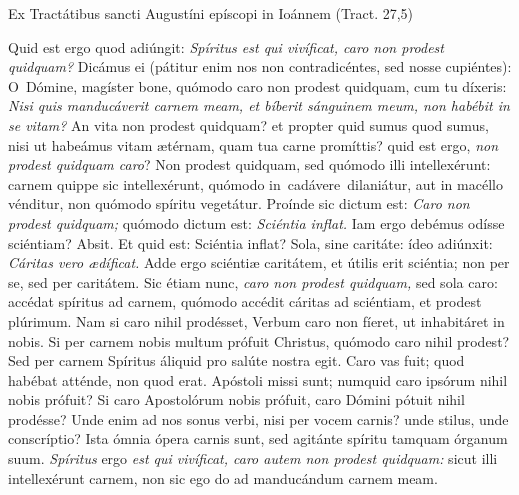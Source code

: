 \documentclass[options]{article}
\begin{document}
Ex Tractátibus sancti Augustíni epíscopi in Ioánnem (Tract. 27,5)

Quid est ergo quod adiúngit: 
\textit{Spíritus est qui vivíficat, caro non prodest quidquam?}
Dicámus ei (pátitur enim nos non contradicéntes, sed nosse cupiéntes): O Dómine, magíster bone, quómodo caro non prodest quidquam, cum tu díxeris: 
\textit{Nisi quis manducáverit carnem meam, et bíberit sánguinem meum, non habébit in se vitam?}
 An vita non prodest quidquam? et propter quid sumus quod sumus, nisi ut habeámus vitam ætérnam, quam tua carne promíttis? quid est ergo, 
 \textit{non prodest quidquam caro}?
 Non prodest quidquam, sed quómodo illi intellexérunt: carnem quippe sic intellexérunt, quómodo in cadávere dilaniátur, aut in macéllo vénditur, non quómodo spíritu vegetátur. Proínde sic dictum est: 
 \textit{Caro non prodest quidquam;}
  quómodo dictum est: 
\textit{Sciéntia inflat.}
   Iam ergo debémus odísse sciéntiam? Absit. Et quid est: Sciéntia inflat? Sola, sine caritáte: ídeo adiúnxit: 
   \textit{Cáritas vero ædíficat.}
  Adde ergo sciéntiæ caritátem, et útilis erit sciéntia; non per se, sed per caritátem. Sic étiam nunc, 
  \textit{caro non prodest quidquam,}
 sed sola caro: accédat spíritus ad carnem, quómodo accédit cáritas ad sciéntiam, et prodest plúrimum. Nam si caro nihil prodésset, Verbum caro non fíeret, ut inhabitáret in nobis. Si per carnem nobis multum prófuit Christus, quómodo caro nihil prodest? Sed per carnem Spíritus áliquid pro salúte nostra egit. Caro vas fuit; quod habébat atténde, non quod erat. Apóstoli missi sunt; numquid caro ipsórum nihil nobis prófuit? Si caro Apostolórum nobis prófuit, caro Dómini pótuit nihil prodésse? Unde enim ad nos sonus verbi, nisi per vocem carnis? unde stilus, unde conscríptio? Ista ómnia ópera carnis sunt, sed agitánte spíritu tamquam órganum suum. 
 \textit{Spíritus}
  ergo 
  \textit{est qui vivíficat, caro autem non prodest quidquam:}
   sicut illi intellexérunt carnem, non sic ego do ad manducándum carnem meam.
\end{document}
